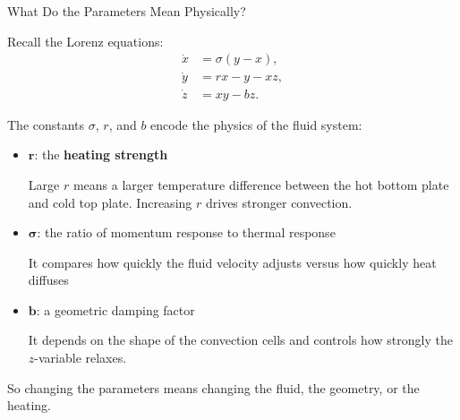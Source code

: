 \documentclass[aspectratio=169]{beamer}
\begin{document}
\begin{frame}{What Do the Parameters Mean Physically?}

Recall the Lorenz equations:
\begin{align*}
\dot{x} &= \sigma (y-x),\\
\dot{y} &= rx-y-xz,\\
\dot{z} &= xy-bz.
\end{align*}

The constants $\sigma$, $r$, and $b$ encode the physics of the fluid system:

\begin{itemize}
\item $\mathbf{r}$: the \textbf{heating strength}

Large $r$ means a larger temperature difference between the hot bottom plate and cold top plate.  
Increasing $r$ drives stronger convection.

\vspace{0.5em}

\item $\mathbf{\sigma}$: the ratio of momentum response to thermal response

It compares how quickly the fluid velocity adjusts versus how quickly heat diffuses

\vspace{0.5em}

\item $\mathbf{b}$: a geometric damping factor

It depends on the shape of the convection cells and controls how strongly the $z$-variable relaxes.

\end{itemize}

\vspace{0.5em}

So changing the parameters means changing the fluid, the geometry, or the heating.
\end{frame}
\end{document}
